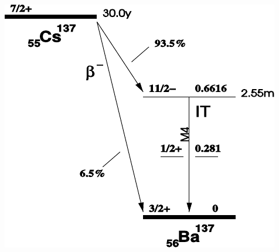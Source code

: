 \begin{multicols}{2}
\begin{center}
\begin{adjustbox}{max width=\linewidth, keepaspectratio}
        \end{adjustbox}
        \label{fig:133BaDecayScheme}
    \end{center}
\endminipage
%
\vspace{10mm}
%
\minipage{\linewidth}
    \begin{center}
        \captionsetup{type=figure}
        \begin{adjustbox}{max width=\linewidth, keepaspectratio}
            \includegraphics[]{pdf/137Cs}
        \end{adjustbox}
        \label{fig:137CsDecayScheme}
    \end{center}
\endminipage
%
\newpage
%
\end{multicols}
%
